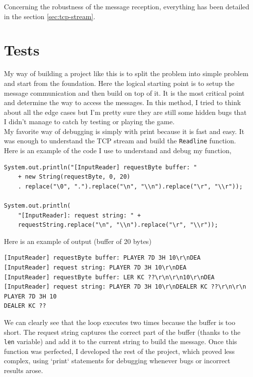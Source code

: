 \documentclass[11pt]{article}
\begin{document}
Concerning the robustness of the message reception, everything has been detailed in the section \ref{sec:tcp-stream}.

\section{Tests}

My way of building a project like this is to split the problem into simple problem and start from the foundation. Here the logical starting point is to setup the message communication and then build on top of it. It is the most critical point and determine the way to access the messages. In this method, I tried to think about all the edge cases but I'm pretty sure they are still some hidden bugs that I didn't manage to catch by testing or playing the game.\\
My favorite way of debugging is simply with print because it is fast and easy. It was enough to understand the TCP stream and build the \texttt{Readline} function. Here is an example of the code I use to understand and debug my function, 

\begin{verbatim}
System.out.println("[InputReader] requestByte buffer: "
    + new String(requestByte, 0, 20)
    . replace("\0", ".").replace("\n", "\\n").replace("\r", "\\r"));

System.out.println(
    "[InputReader]: request string: " +
    requestString.replace("\n", "\\n").replace("\r", "\\r"));
\end{verbatim}

\noindent Here is an example of output (buffer of 20 bytes)

\begin{verbatim}
[InputReader] requestByte buffer: PLAYER 7D 3H 10\r\nDEA
[InputReader] request string: PLAYER 7D 3H 10\r\nDEA
[InputReader] requestByte buffer: LER KC ??\r\n\r\n10\r\nDEA
[InputReader] request string: PLAYER 7D 3H 10\r\nDEALER KC ??\r\n\r\n
PLAYER 7D 3H 10
DEALER KC ??
\end{verbatim}

\noindent We can clearly see that the loop executes two times because the buffer is too short. The request string captures the correct part of the buffer (thanks to the \texttt{len} variable) and add it to the current string to build the message.
Once this function was perfected, I developed the rest of the project, which proved less complex, using `print` statements for debugging whenever bugs or incorrect results arose.
\end{document}
